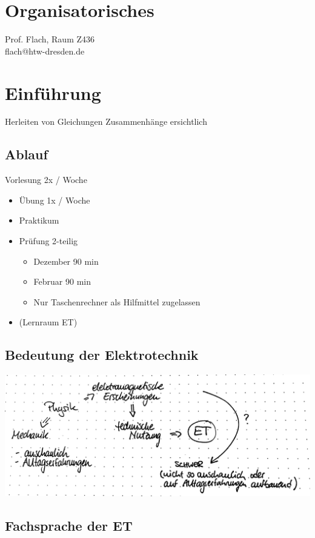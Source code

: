 \section{Organisatorisches}

Prof. Flach, Raum Z436\\
flach@htw-dresden.de

\section{Einführung}

Herleiten von Gleichungen \Ra Zusammenhänge ersichtlich

\subsection{Ablauf}

Vorlesung 2x / Woche
\begin{itemize}
	\item Übung 1x / Woche
	\item Praktikum
	\item Prüfung 2-teilig
	\begin{itemize}
		\item Dezember 90 min
		\item Februar 90 min
		\item Nur Taschenrechner als Hilfmittel zugelassen
	\end{itemize}
	\item (Lernraum ET)
\end{itemize}

\subsection{Bedeutung der Elektrotechnik}

\includegraphics[width=\textwidth]{img/1_1}

\subsection{Fachsprache der ET}

